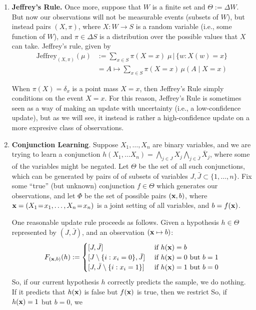 \documentclass{article}
\begin{document}
\begin{enumerate}
    \item \textbf{Jeffrey's Rule.}
    Once more, suppose that $W$ is a finite set and $\Theta := \Delta W$. But now our observations will not be measurable events (subsets of $W$), but instead pairs $(X,\pi)$,
    where $X : W \to S$ is a random variable (i.e., some function of $W$), and $\pi \in \Delta S$ is a distribution over the possible values that $X$ can take.
    Jeffrey's rule, given by
    \begin{align*}
        \mathrm{Jeffrey}_{(X,\pi)} (\mu) &:= \sum_{x \in S} \pi(X\!=x) \;  \mu \,\Big|\, \{ w : X(w) = x \}
            \\
            &= A \mapsto \sum_{x \in S} \pi(X\!=x)\, \mu( A \mid X \!= x)
    \end{align*}

    When $\pi(X) = \delta_x$ is a point mass $X=x$, then Jeffrey's Rule simply conditions on the event $X = x$.
    For this reason, Jeffrey's Rule is sometimes seen as a way of making an update with uncertainty (i.e., a low-confidence update), but as we will see, it instead is rather a high-confidence update on a more expresive class of observations.

    \item \textbf{Conjunction Learning}.
    Suppose $X_1, \ldots, X_n$ are binary variables, and we are trying to learn a conjunction
    $h(X_1, \ldots X_n) = \bigwedge_{j \in J} X_j \bigwedge_{j \in \bar J} \bar X_j$,
    where some of the variables might be negated.
    Let $\Theta$ be the set of all such conjunctions, which can be generated by pairs of of subsets of variables $J,\bar J \subset \{1, \ldots, n\}$.
    Fix some ``true'' (but unknown) conjunction $f \in \Theta$ which generates our observations, and let $\Phi$ be the set of possible pairs $(\mathbf{x}, b)$, where
    $\mathbf{x} = (X_1\!=\!x_1, \ldots, X_n \!=\!x_n)$ is a joint setting of all variables, and $b = f(\mathbf{x})$.

    One reasonable update rule proceeds as follows. Given a hypothesis $h \in \Theta$ represented by $(J, \bar J)$, and an observation $(\mathbf{x} \mapsto b)$:
    \[
        F_{(\mathbf{x}, b)}(h) :=
        \begin{cases}
            [J, \bar J] & \text{ if } h(\mathbf{x}) = b \\
            [J \setminus \{i : x_i = 0\}, \bar J] &\text{ if } h(\mathbf{x}) = 0 \text { but } b = 1\\
            [J, \bar J \setminus \{i : x_i = 1\}] &\text{ if } h(\mathbf{x}) = 1 \text { but } b = 0\\
    \end{cases}
    \]
    So, if our current hypothesis $h$ correctly predicts the sample, we do nothing. If it predicts that $h(\mathbf{x})$ is false but $f(\mathbf{x})$ is true, then we restrict
    So, if $h(\mathbf{x}) = 1$ but $b = 0$, we


\end{enumerate}
\end{document}
